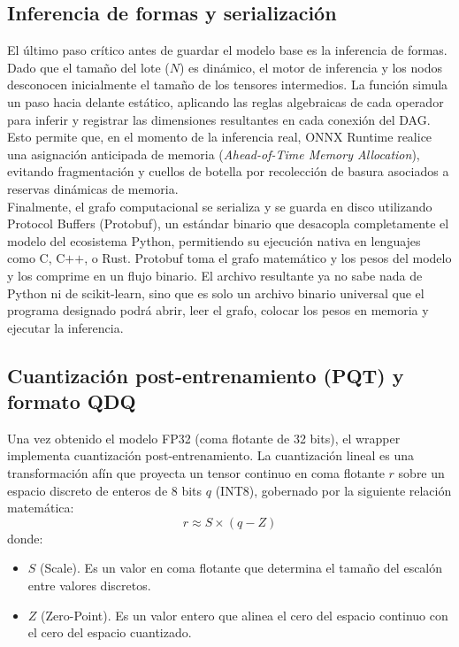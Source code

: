 \documentclass[a4paper,12pt,twoside,final]{book}
\begin{document}
\subsection{Inferencia de formas y serialización}
El último paso crítico antes de guardar el modelo base es la inferencia de formas. Dado que el tamaño del lote ($N$) es
dinámico, el motor de inferencia y los nodos desconocen inicialmente el tamaño de los tensores intermedios. La función
 simula un paso hacia delante estático, aplicando las reglas algebraicas de cada operador para
inferir y registrar las dimensiones resultantes en cada conexión del DAG. Esto permite que, en el momento de la
inferencia real, ONNX Runtime realice una asignación anticipada de memoria (\textit{Ahead-of-Time Memory Allocation}),
evitando fragmentación y cuellos de botella por recolección de basura asociados a reservas dinámicas de memoria.\\

Finalmente, el grafo computacional se serializa y se guarda en disco utilizando Protocol Buffers (Protobuf), un
estándar binario que desacopla completamente el modelo del ecosistema Python, permitiendo su ejecución nativa en
lenguajes como C, C$+$$+$, o Rust. Protobuf toma el grafo matemático y los pesos del modelo y los comprime en un flujo
binario. El archivo  resultante ya no sabe nada de Python ni de scikit-learn, sino que es solo un archivo
binario universal que el programa designado podrá abrir, leer el grafo, colocar los pesos en memoria y ejecutar la
inferencia.

\subsection{Cuantización post-entrenamiento (PQT) y formato QDQ}
Una vez obtenido el modelo FP32 (coma flotante de 32 bits), el wrapper implementa cuantización post-entrenamiento. La
cuantización lineal es una transformación afín que proyecta un tensor continuo en coma flotante $r$ sobre un espacio
discreto de enteros de 8 bits $q$ (INT8), gobernado por la siguiente relación matemática:
\[
r \approx S \times (q - Z)
\]
donde:
\begin{itemize}
  \item $S$ (Scale). Es un valor en coma flotante que determina el tamaño del escalón entre valores discretos.
  \item $Z$ (Zero-Point). Es un valor entero que alinea el cero del espacio continuo con el cero del espacio
  cuantizado.
\end{itemize}
\end{document}
